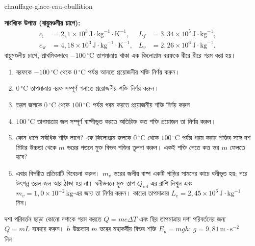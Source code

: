 
\begin{exo}[ঠান্ডা বরফ থেকে ফুটন্ত জল: মাত্রার ক্রম]{chauffage-glace-eau-ebullition}

\textbf{সাংখ্যিক উপাত্ত (বায়ুমণ্ডলীয় চাপে):}
\[
\begin{aligned}
c_{\mathrm{i}} &= 2{,}1\times10^3\,\text{J}\!\cdot\!\text{kg}^{-1}\!\cdot\!\text{K}^{-1},
& L_f &= 3{,}34\times10^5\,\text{J}\!\cdot\!\text{kg}^{-1},\\
c_{\mathrm{w}} &= 4{,}18\times10^3\,\text{J}\!\cdot\!\text{kg}^{-1}\!\cdot\!\text{K}^{-1},
& L_v &= 2{,}26\times10^6\,\text{J}\!\cdot\!\text{kg}^{-1}.
\end{aligned}
\]
বায়ুমণ্ডলীয় চাপে, প্রাথমিকভাবে $-100\,{}^\circ\text{C}$ তাপমাত্রায় থাকা এক কিলোগ্রাম বরফকে ধীরে ধীরে গরম করা হয়।

\begin{enumerate}
  \item বরফকে $-100\,{}^\circ\text{C}$ থেকে $0\,{}^\circ\text{C}$ পর্যন্ত আনতে প্রয়োজনীয় শক্তি নির্ণয় করুন।
  \item $0\,{}^\circ\text{C}$ তাপমাত্রায় বরফ সম্পূর্ণ গলাতে প্রয়োজনীয় শক্তি নির্ণয় করুন।
  \item তরল জলকে $0\,{}^\circ\text{C}$ থেকে $100\,{}^\circ\text{C}$ পর্যন্ত গরম করতে প্রয়োজনীয় শক্তি নির্ণয় করুন।
  \item $100\,{}^\circ\text{C}$ তাপমাত্রায় জল সম্পূর্ণ বাষ্পীভূত করতে অতিরিক্ত কত শক্তি প্রয়োজন তা নির্ণয় করুন।
  \item কোন ধাপে সর্বাধিক শক্তি লাগে? এক কিলোগ্রাম জলকে $0\,{}^\circ\text{C}$ থেকে $100\,{}^\circ\text{C}$ পর্যন্ত গরম করার শক্তির সঙ্গে দশ মিটার উচ্চতা থেকে $m$ ভরের পতনে মুক্ত বিভব শক্তির তুলনা করুন। একই শক্তি পেতে কত ভর $m$ ফেলতে হবে?
  \item এবার বিপরীত প্রক্রিয়াটি বিবেচনা করুন। $m_v$ ভরের জলীয় বাষ্প একটি গাড়ির সামনের কাচে ঘনীভূত হয়; পরে উৎপন্ন তরল জল আর ঠান্ডা হয় না। ঘনীভবনে মুক্ত তাপ $Q_{\mathrm{rel}}$-এর রাশি লিখুন এবং $m_v=1{,}0\times10^{-2}\,\text{kg}$-এর জন্য তা নির্ণয় করুন। কাচের তাপমাত্রায় $L_v=2{,}45\times10^6\,\text{J}\!\cdot\!\text{kg}^{-1}$ নিন।
\end{enumerate}

\begin{indication}
দশা পরিবর্তন ছাড়া কোনো দশাকে গরম করতে $Q=mc\Delta T$ এবং স্থির তাপমাত্রায় দশা পরিবর্তনের জন্য $Q=mL$ ব্যবহার করুন। $h$ উচ্চতায় $m$ ভরের মহাকর্ষীয় বিভব শক্তি $E_p=mgh$; $g=9{,}81\,\text{m}\!\cdot\!\text{s}^{-2}$ নিন।
\end{indication}


\end{exo}
